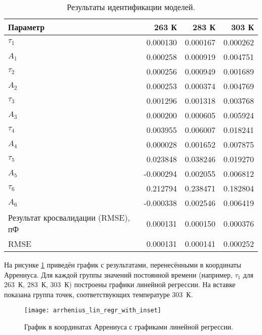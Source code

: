 	\begin{table}[!htp]
		\centering
		\caption{Результаты идентификации моделей.}
		\begin{tabular}{|l|r|r|r|}
			\hline
			Параметр                           &  263 К    & 283 К    & 303 К    \\ \hline
			$\tau_1$                           &  0.000130 & 0.000167 & 0.000262 \\ \hline
			$A_1$                              &  0.000258 & 0.000919 & 0.004751 \\ \hline
			$\tau_2$                           &  0.000256 & 0.000949 & 0.001689 \\ \hline
			$A_2$                              &  0.000253 & 0.000374 & 0.004769 \\ \hline
			$\tau_3$                           &  0.001296 & 0.001318 & 0.003768 \\ \hline
			$A_3$                              &  0.000200 & 0.000605 & 0.005924 \\ \hline
			$\tau_4$                           &  0.003955 & 0.006007 & 0.018241 \\ \hline
			$A_4$                              &  0.000028 & 0.001652 & 0.007875 \\ \hline
			$\tau_5$                           &  0.023848 & 0.038246 & 0.019270 \\ \hline
			$A_5$                              & -0.000294 & 0.002055 & 0.006812 \\ \hline
			$\tau_6$                           &  0.212794 & 0.238471 & 0.182804 \\ \hline
			$A_6$                              & -0.000338 & 0.002546 & 0.006419 \\ \hline
			Результат кросвалидации (RMSE), пФ &  0.000131 & 0.000150 & 0.000376 \\ \hline
			RMSE                               &  0.000131 & 0.000141 & 0.000252 \\ \hline
		\end{tabular}
		\label{table:6_exp_results}
	\end{table}


	На рисунке \ref{pic:arrhenius_lin_regr_with_inset} приведён график с
	результатами, перенесёнными в координаты Аррениуса. Для каждой группы
	значений постоянной времени (например, $\tau_1$ для 263~К, 283~К, 303~К)
	построены графики линейной регрессии. На вставке показана группа точек, 
	соответствующих температуре 303~К.

	\begin{figure}[!htp]
		\centering
		\texttt{[image: arrhenius\_lin\_regr\_with\_inset]}
		\caption{График в координатах Аррениуса с графиками линейной регрессии.}
		\label{pic:arrhenius_lin_regr_with_inset}
	\end{figure}


